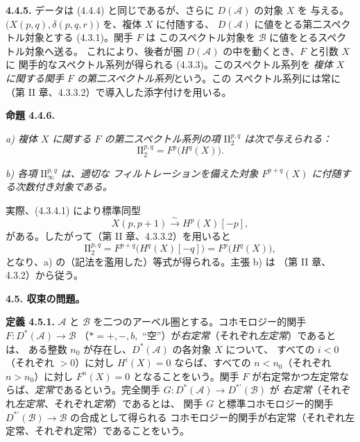 \clearpage
{}%
\begingroup\small\setlength{\parskip}{0pt}\setlength{\emergencystretch}{1.5em}
\setlength{\abovedisplayskip}{4pt plus 2pt minus 2pt}%
\setlength{\belowdisplayskip}{4pt plus 2pt minus 2pt}%

\noindent\textbf{4.4.5.}\quad
データは (4.4.4) と同じであるが、さらに $D(\mathcal A)$ の対象 $X$ を
与える。$\bigl(X(p,q),\delta(p,q,r)\bigr)$ を、複体 $X$ に付随する、
$D(\mathcal A)$ に値をとる第二スペクトル対象とする (4.3.1)。関手 $F$ は
このスペクトル対象を $\mathcal B$ に値をとるスペクトル対象へ送る。
これにより、後者が圏 $D(\mathcal A)$ の中を動くとき、$F$ と引数 $X$ に
関手的なスペクトル系列が得られる (4.3.3)。このスペクトル系列を
\emph{複体 $X$ に関する関手 $F$ の第二スペクトル系列}という。この
スペクトル系列には常に（第 II 章、4.3.3.2）で導入した添字付けを用いる。

\medskip\noindent\textbf{命題 4.4.6.}\quad

\noindent\textit{a) 複体 $X$ に関する $F$ の第二スペクトル系列の項
$\mathrm{II}_2^{p,q}$ は次で与えられる：}
\[
\mathrm{II}_2^{p,q}=F^p\bigl(H^q(X)\bigr).
\]

\noindent\textit{b) 各項 $\mathrm{II}_{\infty}^{p,q}$ は、適切な
フィルトレーションを備えた対象 $F^{p+q}(X)$ に付随する次数付き対象である。}

実際、(4.3.4.1) により標準同型
\[
X(p,p+1)\xrightarrow{\sim}H^p(X)[-p],
\]
がある。したがって（第 II 章、4.3.3.2）を用いると
\[
\mathrm{II}_2^{p,q}
=F^{p+q}\bigl(H^q(X)[-q]\bigr)
=F^p\bigl(H^q(X)\bigr),
\]
となり、a) の（記法を濫用した）等式が得られる。主張 b) は
（第 II 章、4.3.2）から従う。

\medskip\noindent\textbf{4.5. 収束の問題。}

\noindent\textbf{定義 4.5.1.}\quad
$\mathcal A$ と $\mathcal B$ を二つのアーベル圏とする。コホモロジー的関手
$F\colon D^*(\mathcal A)\longrightarrow\mathcal B$
（$*=+,-,b,{}$ ``空''）が\emph{右定常}（それぞれ\emph{左定常}）であるとは、
ある整数 $n_0$ が存在し、$D^*(\mathcal A)$ の各対象 $X$ について、
すべての $i<0$（それぞれ $>0$）に対し $H^i(X)=0$ ならば、すべての
$n<n_0$（それぞれ $n>n_0$）に対し $F^n(X)=0$ となることをいう。関手
$F$ が右定常かつ左定常ならば、\emph{定常}であるという。完全関手
$G\colon D^*(\mathcal A)\longrightarrow D^{*'}(\mathcal B)$ が
\emph{右定常}（それぞれ\emph{左定常}、それぞれ\emph{定常}）であるとは、
関手 $G$ と標準コホモロジー的関手
$D^{*'}(\mathcal B)\longrightarrow\mathcal B$ の合成として得られる
コホモロジー的関手が右定常（それぞれ左定常、それぞれ定常）であることをいう。
\endgroup
